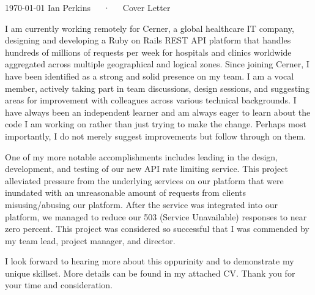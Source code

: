 \documentclass[11pt, a4paper]{awesome-cv}
\begin{document}
\makecvheader[C]

\makecvfooter
  {\today}
  {Ian Perkins~~~·~~~Cover Letter}
  {}

\makelettertitle

\begin{cvletter}

I am currently working remotely for Cerner, a global healthcare IT company, designing and developing a Ruby on Rails REST API platform that handles hundreds of millions of requests per week for hospitals and clinics worldwide aggregated across multiple geographical and logical zones. Since joining Cerner, I have been identified as a strong and solid presence on my team. I am a vocal member, actively taking part in team discussions, design sessions, and suggesting areas for improvement with colleagues across various technical backgrounds. I have always been an independent learner and am always eager to learn about the code I am working on rather than just trying to make the change. Perhaps most importantly, I do not merely suggest improvements but follow through on them.

One of my more notable accomplishments includes leading in the design, development, and testing of our new API rate limiting service. This project alleviated pressure from the underlying services on our platform that were inundated with an unreasonable amount of requests from clients misusing/abusing our platform. After the service was integrated into our platform, we managed to reduce our 503 (Service Unavailable) responses to near zero percent. This project was considered so successful that I was commended by my team lead, project manager, and director.

I look forward to hearing more about this oppurinity and to demonstrate my unique skillset. More details can be found in my attached CV. Thank you for your time and consideration.




\end{cvletter}
\end{document}
